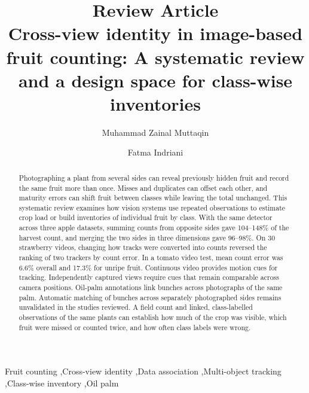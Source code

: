 \documentclass[a4paper,fleqn]{cas-dc}
\begin{document}
\title[mode=title]{{\normalsize Review Article}\\[3pt] Cross-view identity in image-based fruit counting: A systematic review and a design space for class-wise inventories}
\author[1]{Muhammad Zainal Muttaqin}
\author[1]{Fatma Indriani}
\cormark[1]
\begin{abstract}
Photographing a plant from several sides can reveal previously hidden fruit and record the same fruit more than once. Misses and duplicates can offset each other, and maturity errors can shift fruit between classes while leaving the total unchanged. This systematic review examines how vision systems use repeated observations to estimate crop load or build inventories of individual fruit by class.
With the same detector across three apple datasets, summing counts from opposite sides gave 104--148\% of the harvest count, and merging the two sides in three dimensions gave 96--98\%. On 30 strawberry videos, changing how tracks were converted into counts reversed the ranking of two trackers by count error. In a tomato video test, mean count error was 6.6\% overall and 17.3\% for unripe fruit.
Continuous video provides motion cues for tracking. Independently captured views require cues that remain comparable across camera positions. Oil-palm annotations link bunches across photographs of the same palm. Automatic matching of bunches across separately photographed sides remains unvalidated in the studies reviewed. A field count and linked, class-labelled observations of the same plants can establish how much of the crop was visible, which fruit were missed or counted twice, and how often class labels were wrong.
\end{abstract}
\begin{keywords}
Fruit counting \sep Cross-view identity \sep Data association \sep Multi-object tracking \sep Class-wise inventory \sep Oil palm
\end{keywords}
\maketitle



\clearpage
\onecolumn
\appendix
\renewcommand{\thetable}{A\arabic{table}}
\renewcommand{\theHtable}{appendix.\arabic{table}}
\setcounter{table}{0}
\end{document}
